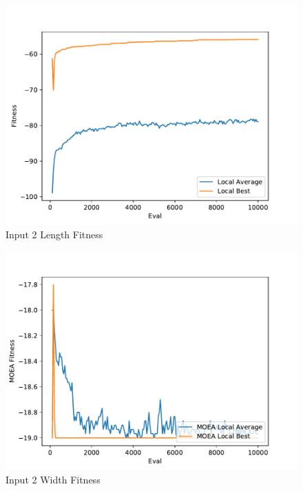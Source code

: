 \documentclass{standalone}
\begin{document}
\begin{figure}[!htb]
	\caption{Input 2 Length Fitness}
	\label{fig:graph_2001}
	\includegraphics[width=\textwidth]{../graphs/graphs/2001.pdf}
\end{figure}


\begin{figure}[!htb]
	\caption{Input 2 Width Fitness}
	\label{fig:graph_2001_moea}
	\includegraphics[width=\textwidth]{../graphs/graphs/2001_moea.pdf}
\end{figure}
\end{document}
